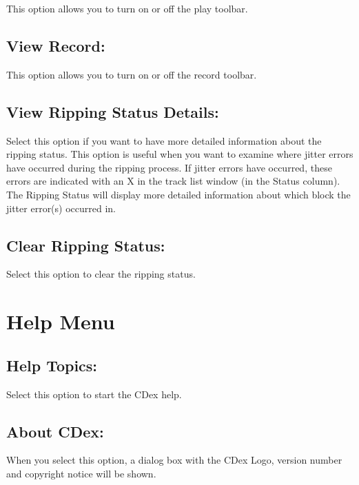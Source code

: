 This option allows you to turn on or off the play toolbar.


\subsection{View Record:}

This option allows you to turn on or off the record toolbar.


\subsection{View Ripping Status Details:}

Select this option if you want to have more detailed information about the
ripping status. This option is useful when you want to examine where jitter 
errors have occurred during the ripping process. If jitter errors have occurred, these 
errors are indicated with an X in the track list window (in the Status column).
The Ripping Status will display more detailed information about which block
the jitter error(s) occurred in.


\subsection{Clear Ripping Status:}

Select this option to clear the ripping status.


\section{Help Menu}


\subsection{Help Topics:}
Select this option to start the CDex help.


\subsection{About CDex:}


When you select this option, a dialog box with the CDex Logo,
version number and copyright notice will be shown.

